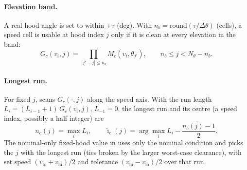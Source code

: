 \paragraph{Elevation band.}
A real hood angle is set to within $\pm\tau$ (\unit{deg}).
With $n_b=\mathrm{round}(\tau/\Delta\theta)$ (cells), a speed cell is usable at hood index $j$ only if
it is clean at every elevation in the band:
\begin{equation}
  G_c(v_i,j) = \prod_{|j'-j|\le n_b} M_c(v_i,\theta_{j'}),\qquad n_b\le j< N_\theta-n_b .
  \label{eq:robust_spec-band}
\end{equation}

\paragraph{Longest run.}
For fixed $j$,  scans $G_c(\cdot,j)$ along the speed axis.
With the run length $L_i = (L_{i-1}+1)\,G_c(v_i,j)$, $L_{-1}=0$, the longest run and its centre (a
speed index, possibly a half integer) are
\begin{equation}
  n_c(j) = \max_i L_i,\qquad
  \hat\imath_c(j) = \arg\max_i L_i - \frac{n_c(j)-1}{2}.
  \label{eq:robust_spec-run}
\end{equation}
The nominal-only fixed-hood value in  uses only the nominal condition and picks the $j$
with the longest run (ties broken by the larger worst-case clearance), with set speed
$(v_{\mathrm{lo}}+v_{\mathrm{hi}})/2$ and tolerance $(v_{\mathrm{hi}}-v_{\mathrm{lo}})/2$ over that run.

